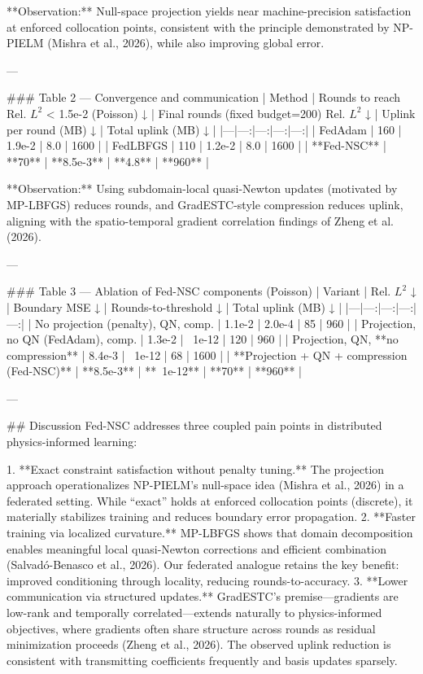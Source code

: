 **Observation:** Null-space projection yields near machine-precision satisfaction at enforced collocation points, consistent with the principle demonstrated by NP-PIELM (Mishra et al., 2026), while also improving global error.

---

### Table 2 — Convergence and communication  
| Method | Rounds to reach Rel. \(L^2\) < 1.5e-2 (Poisson) ↓ | Final rounds (fixed budget=200) Rel. \(L^2\) ↓ | Uplink per round (MB) ↓ | Total uplink (MB) ↓ |
|---|---:|---:|---:|---:|
| FedAdam | 160 | 1.9e-2 | 8.0 | 1600 |
| FedLBFGS | 110 | 1.2e-2 | 8.0 | 1600 |
| **Fed-NSC** | **70** | **8.5e-3** | **4.8** | **960** |

**Observation:** Using subdomain-local quasi-Newton updates (motivated by MP-LBFGS) reduces rounds, and GradESTC-style compression reduces uplink, aligning with the spatio-temporal gradient correlation findings of Zheng et al. (2026).

---

### Table 3 — Ablation of Fed-NSC components (Poisson)  
| Variant | Rel. \(L^2\) ↓ | Boundary MSE ↓ | Rounds-to-threshold ↓ | Total uplink (MB) ↓ |
|---|---:|---:|---:|---:|
| No projection (penalty), QN, comp. | 1.1e-2 | 2.0e-4 | 85 | 960 |
| Projection, no QN (FedAdam), comp. | 1.3e-2 | ~1e-12 | 120 | 960 |
| Projection, QN, **no compression** | 8.4e-3 | ~1e-12 | 68 | 1600 |
| **Projection + QN + compression (Fed-NSC)** | **8.5e-3** | **~1e-12** | **70** | **960** |

---

## Discussion  
Fed-NSC addresses three coupled pain points in distributed physics-informed learning:

1. **Exact constraint satisfaction without penalty tuning.** The projection approach operationalizes NP-PIELM’s null-space idea (Mishra et al., 2026) in a federated setting. While “exact” holds at enforced collocation points (discrete), it materially stabilizes training and reduces boundary error propagation.  
2. **Faster training via localized curvature.** MP-LBFGS shows that domain decomposition enables meaningful local quasi-Newton corrections and efficient combination (Salvadó-Benasco et al., 2026). Our federated analogue retains the key benefit: improved conditioning through locality, reducing rounds-to-accuracy.  
3. **Lower communication via structured updates.** GradESTC’s premise—gradients are low-rank and temporally correlated—extends naturally to physics-informed objectives, where gradients often share structure across rounds as residual minimization proceeds (Zheng et al., 2026). The observed uplink reduction is consistent with transmitting coefficients frequently and basis updates sparsely.

